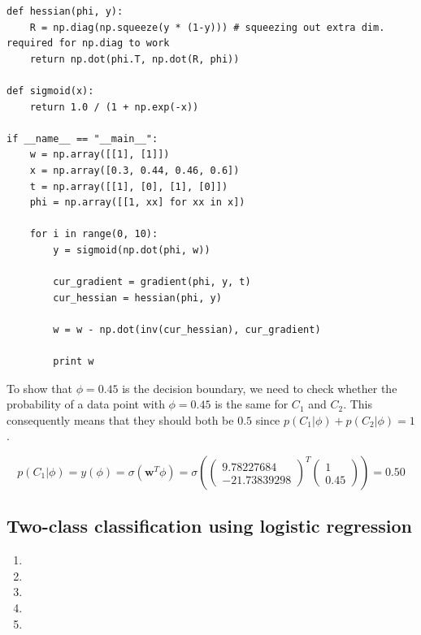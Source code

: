 \documentclass[paper=a4, fontsize=10pt]{scrartcl} %
\numberwithin{equation}{section} %
\numberwithin{figure}{section} %
\numberwithin{table}{section} %
\begin{document}
\begin{enumerate}
\begin{verbatim}
def hessian(phi, y):
    R = np.diag(np.squeeze(y * (1-y))) # squeezing out extra dim. required for np.diag to work
    return np.dot(phi.T, np.dot(R, phi))

def sigmoid(x):
    return 1.0 / (1 + np.exp(-x))

if __name__ == "__main__":
    w = np.array([[1], [1]])
    x = np.array([0.3, 0.44, 0.46, 0.6])
    t = np.array([[1], [0], [1], [0]])
    phi = np.array([[1, xx] for xx in x])

    for i in range(0, 10):
        y = sigmoid(np.dot(phi, w))

        cur_gradient = gradient(phi, y, t)
        cur_hessian = hessian(phi, y)

        w = w - np.dot(inv(cur_hessian), cur_gradient)

        print w
		\end{verbatim}

		To show that $\phi = 0.45$ is the decision boundary, we need to check whether the probability of a data point with $\phi = 0.45$ is the same for $C_1$ and $C_2$. This consequently means that they should both be $0.5$ since $p(C_1 \vert \phi) + p(C_2 \vert \phi) = 1$.

		\begin{equation}
			p(C_1 \vert \phi) = y(\phi) = \sigma (\boldsymbol w^T \phi) = \sigma (\begin{pmatrix} 9.78227684 \\ -21.73839298 \end{pmatrix}^T \begin{pmatrix} 1\\0.45 \end{pmatrix}) = 0.50
		\end{equation}
\end{enumerate}

\subsection{Two-class classification using logistic regression}
\begin{enumerate}
	\item 
	\item
	\item
	\item
	\item
\end{enumerate}
\end{document}
